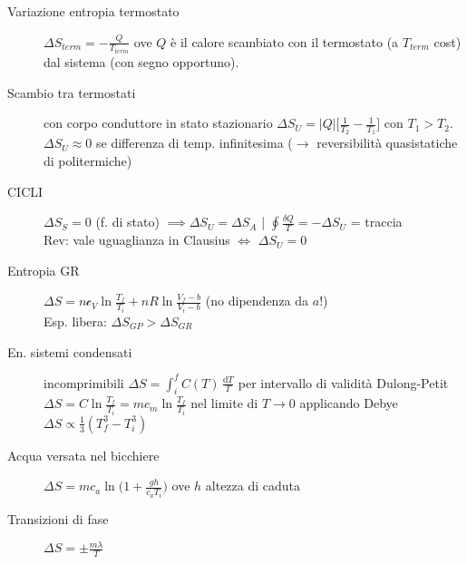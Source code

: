 \documentclass[10pt, oneside]{article}
\begin{document}
\begin{description}
\item[Variazione entropia termostato] $\displaystyle \Delta S_{term} = - \frac{Q}{T_{term}}$ ove $Q$ è il calore scambiato con il termostato (a $T_{term}$ cost) dal sistema (con segno opportuno).
\item[Scambio tra termostati] con corpo conduttore in stato stazionario $\displaystyle \Delta S_U = |Q| \bigg[\frac{1}{T_2} - \frac{1}{T_1}\bigg]$ con $T_1 > T_2$. $\Delta S_U \approx 0$ se differenza di temp. infinitesima ($\rightarrow$ reversibilità quasistatiche di politermiche)
\item[CICLI] $\displaystyle \Delta S_S = 0$ (f. di stato) $\displaystyle \implies \Delta S_U = \Delta S_A$ \bigg| $\displaystyle \oint \frac{\delta Q}{T} = - \Delta S_U$ = traccia
\\Rev: vale uguaglianza in Clausius $\Leftrightarrow$ $\displaystyle \Delta S_U = 0$
\end{description}
\begin{description}
\item[Entropia GR] $\displaystyle \Delta S = n \mathcal{c}_V \ln \frac{T_f}{T_i} + nR \ln \frac{V_f - b}{V_i - b}$ (no dipendenza da $a$!)
\\Esp. libera: $\Delta S_{GP} > \Delta S_{GR}$
\item[En. sistemi condensati] incomprimibili $\displaystyle \Delta S = \int_i^f C(T) \,\frac{\mathrm{d}T}{T}$ per intervallo di validità Dulong-Petit $\displaystyle \Delta S = C \ln \frac{T_f}{T_i} = m c_m \ln \frac{T_f}{T_i}$ nel limite di $T \rightarrow 0$ applicando Debye $\displaystyle \Delta S \propto \frac{1}{3} (T_f^3 - T_i^3)$
\item[Acqua versata nel bicchiere] $\displaystyle \Delta S = m c_a \ln \bigg( 1 + \frac{gh}{c_a T_i} \bigg)$ ove $h$ altezza di caduta
\item[Transizioni di fase] $\displaystyle \Delta S = \pm \frac{m \lambda}{T}$
\end{description}
\end{document}

